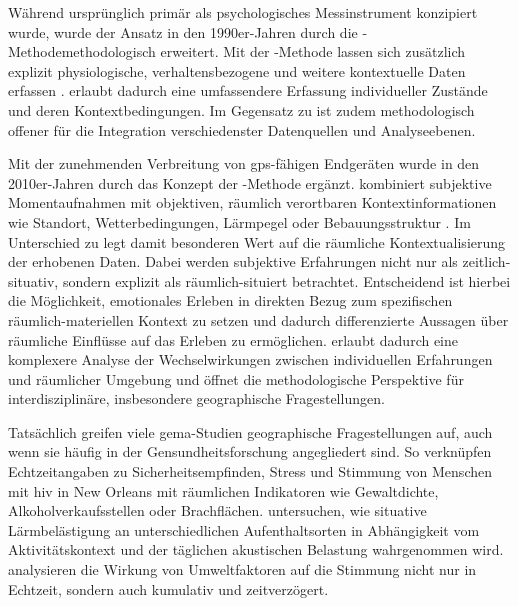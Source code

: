 Während  ursprünglich primär als psychologisches Messinstrument konzipiert wurde, wurde der Ansatz in den 1990er-Jahren durch die \emph{}-Methode\footnotemark methodologisch erweitert. Mit der -Methode lassen sich zusätzlich explizit physiologische, verhaltensbezogene und weitere kontextuelle Daten erfassen \parencite{shiffmanEcologicalMomentaryAssessment2008}.  erlaubt dadurch eine umfassendere Erfassung individueller Zustände und deren Kontextbedingungen. Im Gegensatz zu  ist  zudem methodologisch offener für die Integration verschiedenster Datenquellen und Analyseebenen.


Mit der zunehmenden Verbreitung von \gls{gps}-fähigen Endgeräten wurde  in den 2010er-Jahren durch das Konzept der \emph{}-Methode ergänzt.  kombiniert subjektive Momentaufnahmen mit objektiven, räumlich verortbaren Kontextinformationen wie Standort, Wetterbedingungen, Lärmpegel oder Bebauungsstruktur \parencite{kirchnerSpatiotemporalDeterminantsMental2016}. Im Unterschied zu  legt  damit besonderen Wert auf die räumliche Kontextualisierung der erhobenen Daten. Dabei werden subjektive Erfahrungen nicht nur als zeitlich-situativ, sondern explizit als räumlich-situiert betrachtet. Entscheidend ist hierbei die Möglichkeit, emotionales Erleben in direkten Bezug zum spezifischen räumlich-materiellen Kontext zu setzen und dadurch differenzierte Aussagen über räumliche Einflüsse auf das Erleben zu ermöglichen.  erlaubt dadurch eine komplexere Analyse der Wechselwirkungen zwischen individuellen Erfahrungen und räumlicher Umgebung und öffnet die methodologische Perspektive für interdisziplinäre, insbesondere geographische Fragestellungen.

Tatsächlich greifen viele \gls{gema}-Studien geographische Fragestellungen auf, auch wenn sie häufig in der Gensundheitsforschung angegliedert sind. So verknüpfen \textcite{gasikUsingGeographicMomentary2025} Echtzeitangaben zu Sicherheitsempfinden, Stress und Stimmung von Menschen mit \gls{hiv} in New Orleans mit räumlichen Indikatoren wie Gewaltdichte, Alkoholverkaufsstellen oder Brachflächen. \textcite{zhangGeographicEcologicalMomentary2020} untersuchen, wie situative Lärmbelästigung an unterschiedlichen Aufenthaltsorten in Abhängigkeit vom Aktivitätskontext und der täglichen akustischen Belastung wahrgenommen wird. \textcite{zhangTemporalityGeographicContexts2023} analysieren die Wirkung von Umweltfaktoren auf die Stimmung nicht nur in Echtzeit, sondern auch kumulativ und zeitverzögert.

